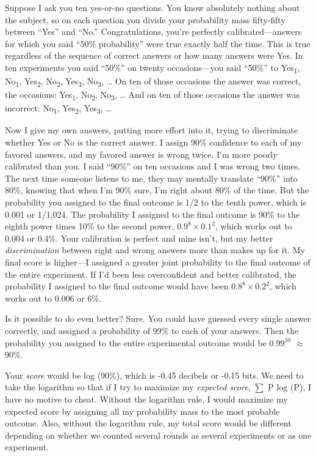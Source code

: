 {
 Suppose I ask you ten yes-or-no questions. You know absolutely
nothing about the subject, so on each question you divide your
probability mass fifty-fifty between
``Yes'' and
``No.'' Congratulations,
you're perfectly calibrated---answers for which you
said ``50\% probability'' were true
exactly half the time. This is true regardless of the sequence of
correct answers or how many answers were Yes. In ten experiments you
said ``50\%'' on twenty
occasions---you said ``50\%'' to
Yes\textsubscript{1}, No\textsubscript{1}, Yes\textsubscript{2},
No\textsubscript{2}, Yes\textsubscript{3}, No\textsubscript{3}, \ldots
On ten of those occasions the answer was correct, the occasions:
Yes\textsubscript{1}, No\textsubscript{2}, No\textsubscript{3}, \ldots
And on ten of those occasions the answer was incorrect:
No\textsubscript{1}, Yes\textsubscript{2}, Yes\textsubscript{3}, \ldots}

{
 Now I give my own answers, putting more effort into it, trying to
discriminate whether Yes or No is the correct answer. I assign 90\%
confidence to each of my favored answers, and my favored answer is
wrong twice. I'm more poorly calibrated than you. I
said ``90\%'' on ten occasions and I
was wrong two times. The next time someone listens to me, they may
mentally translate ``90\%'' into
80\%, knowing that when I'm 90\% sure,
I'm right about 80\% of the time. But the probability
you assigned to the final outcome is 1/2 to the tenth power, which is
0.001 or 1/1,024. The probability I assigned to the final outcome is
90\% to the eighth power times 10\% to the second power,
$0.9^8 \times 0.1^2$, which works
out to 0.004 or 0.4\%. Your calibration is perfect and mine
isn't, but my better \textit{discrimination} between
right and wrong answers more than makes up for it. My final score is
higher---I assigned a greater joint probability to the final outcome of
the entire experiment. If I'd been less overconfident
and better calibrated, the probability I assigned to the final outcome
would have been $0.8^8 \times 0.2^2$, which works out to 0.006 or 6\%.}

{
 Is it possible to do even better? Sure. You could have guessed
every single answer correctly, and assigned a probability of 99\% to
each of your answers. Then the probability you assigned to the entire
experimental outcome would be $0.99^{10}$ ${\approx}$
90\%.}

{
 Your \textit{score} would be log (90\%), which is -0.45 decibels
or -0.15 bits. We need to take the logarithm so that if I try to
maximize my \textit{expected score}, ${\sum}$ P {\texttimes} log (P), I
have no motive to cheat. Without the logarithm rule, I would maximize
my expected score by assigning all my probability mass to the most
probable outcome. Also, without the logarithm rule, my total score
would be different depending on whether we counted several rounds as
several experiments or as one experiment.}

